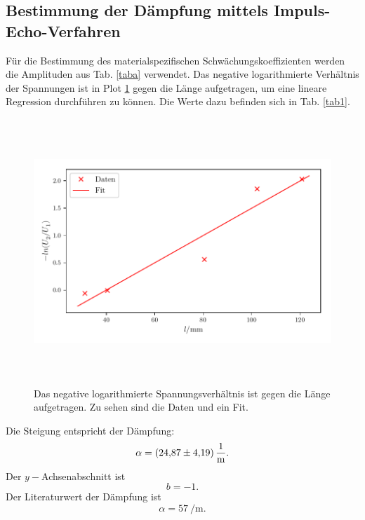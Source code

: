 \subsection{Bestimmung der Dämpfung mittels Impuls-Echo-Verfahren}
Für die Bestimmung des materialspezifischen Schwächungskoeffizienten werden
die Amplituden aus Tab. \ref{taba} verwendet.
Das negative logarithmierte Verhältnis der Spannungen ist in Plot \ref{fig:plot1}
gegen die Länge aufgetragen, um eine lineare Regression durchführen zu können. Die Werte dazu befinden sich in Tab. \ref{tab1}.

\begin{figure}
 \centering
 \includegraphics[width=15cm, height=10cm]{build/plot1.pdf}
 \caption{Das negative logarithmierte Spannungsverhältnis ist gegen die Länge aufgetragen.
 Zu sehen sind die Daten und ein Fit.}
 \label{fig:plot1}
\end{figure}
\noindent Die Steigung entspricht der Dämpfung:
\begin{equation*}
    \alpha = \SI{24.87 \pm 4.19}{\per\meter}.
\end{equation*}
\noindent Der $y-$Achsenabschnitt ist
\begin{equation*}
   b = \num{-1}. 
\end{equation*}
Der Literaturwert der Dämpfung ist
\begin{equation*}
    \alpha = \SI{57}{\per\meter}.
\end{equation*}
